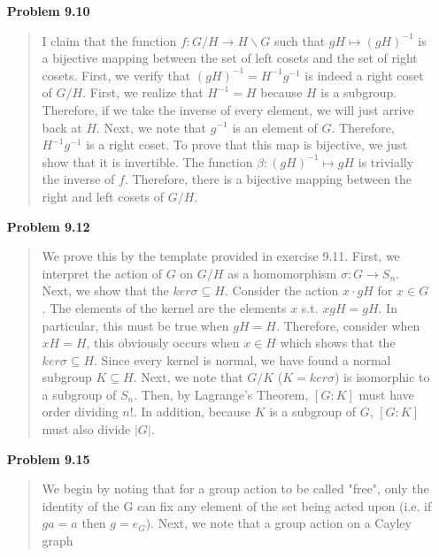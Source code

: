 \documentclass{article}
\begin{document}
\begin{enumerate}
\begin{quote}
            \end{quote} 
        \item[\textbf{Problem 9.10}]
            \begin{quote}
                I claim that the function $f: G/H \to H \backslash G$ such that $gH \mapsto (gH)^{-1}$ is a bijective mapping
                between the set of left cosets and the set of right cosets. First, we verify that $(gH)^{-1} = H^{-1}g^{-1}$ 
                is indeed a right coset of $G/H$. First, we realize that $H^{-1} = H$ because $H$ is a subgroup. Therefore, if 
                we take the inverse of every element, we will just arrive back at $H$. Next, we note that $g^{-1}$ is an element
                of $G$. Therefore, $H^{-1}g^{-1}$ is a right coset. To prove that this map is bijective, we just show that it is 
                invertible. The function $\beta: (gH)^{-1} \mapsto gH$ is trivially the inverse of $f$. Therefore, there is a 
                bijective mapping between the right and left cosets of $G/H$. \qedsymbol
            \end{quote} 
        \item[\textbf{Problem 9.12}]
            \begin{quote}
                We prove this by the template provided in exercise 9.11. First, we interpret the action of $G$ on $G/H$ as a 
                homomorphism $\sigma: G \to S_n$. Next, we show that 
                the $ker\sigma \subseteq H$. Consider the action $x \cdot gH$ for $x \in G$. The elements of the kernel are the
                elements $x$ s.t. $xgH = gH$. In particular, this must be true when $gH = H$. Therefore, consider when $xH = H$,
                this obviously occurs when $x \in H$ which shows that the $ker\sigma \subseteq H$. Since every kernel is normal,
                we have found a normal subgroup $K \subseteq H$. Next, we note that $G/K$ ($K = ker\sigma$) is isomorphic to a subgroup
                of $S_n$. Then, by Lagrange's Theorem, $[G : K]$ must have order dividing $n!$. In addition, because $K$ is a subgroup 
                of $G$, $[G : K]$ must also divide $|G|$. \qedsymbol 
            \end{quote}
        \item[\textbf{Problem 9.15}]
            \begin{quote}
                We begin by noting that for a group action to be called "free", only the identity of the G can fix any element 
                of the set being acted upon (i.e. if $ga = a$ then $g = e_G$). Next, we note that a group action on a Cayley graph

\end{quote}
\end{enumerate}
\end{document}
